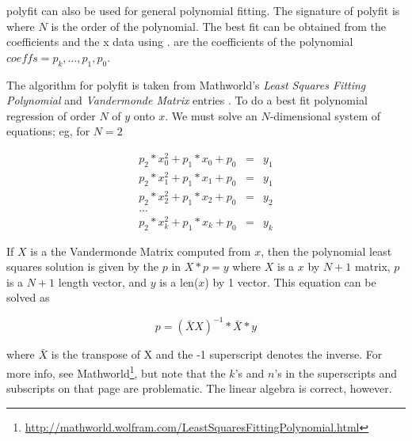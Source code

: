 \documentclass[]{book}
\begin{document}
polyfit can also be used for general polynomial fitting.  The
signature of polyfit is  where $N$ is
the order of the polynomial.  The best fit can be obtained from the
coefficients and the x data using .
 are the coefficients of the polynomial $coeffs = p_k,
\dots, p_1, p_0$.


The algorithm for polyfit is taken from Mathworld's \textit{Least
  Squares Fitting Polynomial} and \textit{Vandermonde Matrix} entries
\citep{Weisstein2002}.
To do a best fit polynomial regression of order $N$ of $y$ onto $x$.
We must solve an $N$-dimensional system of equations; eg, for $N=2$

\begin{eqnarray}
  \label{eq:polysys}
      p_2*x_0^2 +  p_1*x_0 + p_0 &=& y_1\nonumber\\
      p_2*x_1^2 +  p_1*x_1 + p_0 &=& y_1\nonumber\\
      p_2*x_2^2 +  p_1*x_2 + p_0 &=& y_2\nonumber\\
      \dots & \nonumber\\
      p_2*x_k^2 +  p_1*x_k + p_0 &=& y_k\nonumber
\end{eqnarray}

\noindent If $X$ is a the Vandermonde Matrix computed from $x$, then the
polynomial least squares solution is given by the $p$ in $X*p = y$
where $X$ is a $x$ by $N+1$ matrix, $p$ is a $N+1$ length vector, and
$y$ is a len($x$) by 1 vector.  This equation can be solved as

\begin{equation}
  p = (\bar{X} X)^{-1} * \bar{X} * y
\end{equation}
      
\noindent where $\bar{X}$ is the transpose of X and the -1 superscript
denotes the inverse.  For more info, see
Mathworld\footnote{\url{http://mathworld.wolfram.com/LeastSquaresFittingPolynomial.html}},
but note that the $k$'s and $n$'s in the superscripts and subscripts
on that page are problematic.  The linear algebra is correct, however.


\end{document}
